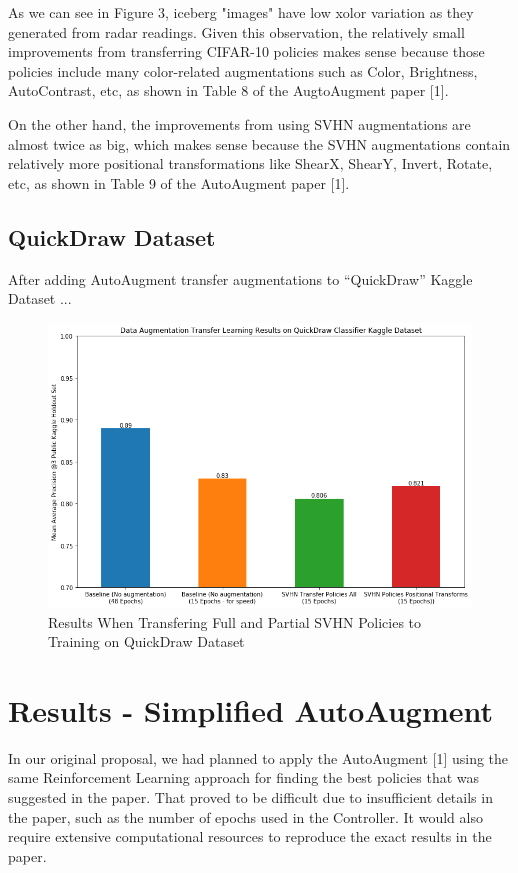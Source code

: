 \documentclass[10pt,twocolumn,letterpaper]{article}
\begin{document}
As we can see in Figure 3, iceberg "images" have low xolor variation as they generated from radar readings. Given this observation, the relatively small improvements from transferring CIFAR-10 policies makes sense because those policies include many color-related augmentations such as Color, Brightness, AutoContrast, etc, as shown in Table 8 of the AugtoAugment paper [1].  

On the other hand, the improvements from using SVHN augmentations are almost twice as big, which makes sense because the SVHN augmentations contain relatively more positional transformations like ShearX, ShearY, Invert, Rotate, etc, as shown in Table 9 of the AutoAugment paper [1].  



\subsection{QuickDraw Dataset}

After adding AutoAugment transfer augmentations to “QuickDraw” Kaggle Dataset ...


\begin{figure}[bhp]
\includegraphics[width=\columnwidth]{quickdraw_results.png}
\caption{Results When Transfering Full and Partial SVHN Policies to Training on QuickDraw Dataset}
\end{figure}

\section{Results - Simplified AutoAugment}


In our original proposal, we had planned to apply the AutoAugment [1] using the same Reinforcement Learning approach for finding the best policies that was suggested in the paper.  That proved to be difficult due to insufficient details in the paper, such as the number of epochs used in the Controller.  It would also require extensive computational resources to reproduce the exact results in the paper.
\end{document}
